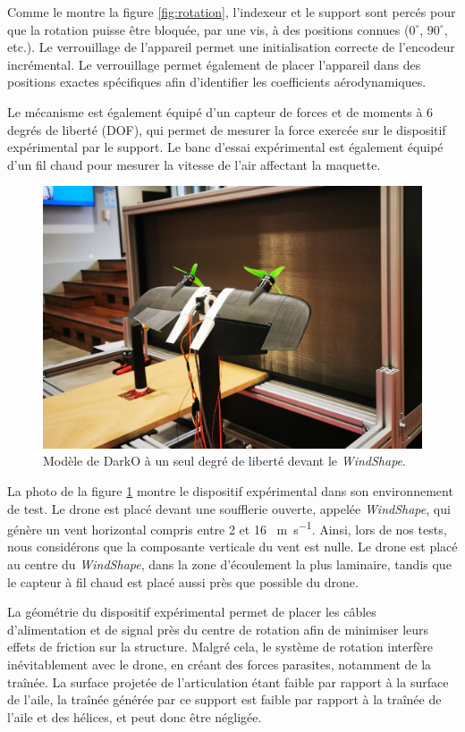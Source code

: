 Comme le montre la figure \ref{fig:rotation}, l'indexeur et le support sont percés pour que la rotation puisse être bloquée, par une vis, à des positions connues ($0^\circ$, $90^\circ$, etc.). Le verrouillage de l'appareil permet une initialisation correcte de l'encodeur incrémental. Le verrouillage permet également de placer l'appareil dans des positions exactes spécifiques afin d'identifier les coefficients aérodynamiques. 

Le mécanisme est également équipé d'un capteur de forces et de moments à 6 degrés de liberté (DOF), qui permet de mesurer la force exercée sur le dispositif expérimental par le support. Le banc d'essai expérimental est également équipé d'un fil chaud pour mesurer la vitesse de l'air affectant la maquette. 

\begin{figure}[!ht]
    \includegraphics[trim=0cm 5cm 0cm 6cm,clip,width=0.8\columnwidth]{figures/real_test_bench-min.jpg}
    \caption{Modèle de DarkO à un seul degré de liberté devant le \textit{WindShape}.}
    \label{fig:real_test_bench}
\end{figure}
La photo de la figure \ref{fig:real_test_bench} montre le dispositif expérimental dans son environnement de test. Le drone est placé devant une soufflerie ouverte, appelée \textit{WindShape}, qui génère un vent horizontal compris entre 2 et 16 \SI{}{\meter\per\second}. Ainsi, lors de nos tests, nous considérons que la composante verticale du vent est nulle. Le drone est placé au centre du \textit{WindShape}, dans la zone d'écoulement la plus laminaire, tandis que le capteur à fil chaud est placé aussi près que possible du drone. 

La géométrie du dispositif expérimental permet de placer les câbles d'alimentation et de signal près du centre de rotation afin de minimiser leurs effets de friction sur la structure. Malgré cela, le système de rotation interfère inévitablement avec le drone, en créant des forces parasites, notamment de la traînée. La surface projetée de l'articulation étant faible par rapport à la surface de l'aile, la traînée générée par ce support est faible par rapport à la traînée de l'aile et des hélices, et peut donc être négligée.

